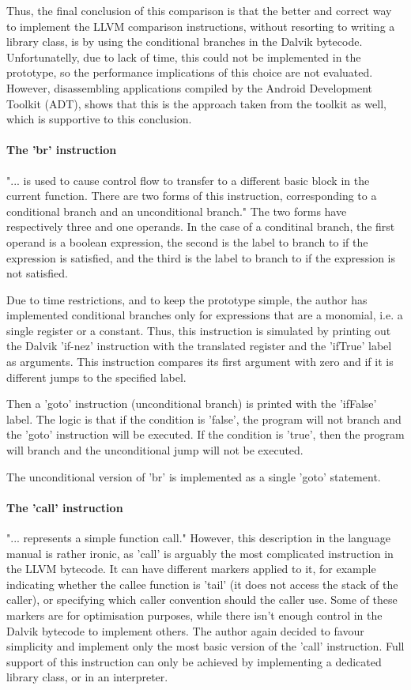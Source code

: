 \documentclass[parskip]{cs4rep}
\begin{document}
Thus, the final conclusion of this comparison is that the better and correct way to implement the LLVM comparison instructions, without resorting to writing a library class, is by using the conditional branches in the Dalvik bytecode. Unfortunatelly, due to lack of time, this could not be implemented in the prototype, so the performance implications of this choice are not evaluated. However, disassembling applications compiled by the Android Development Toolkit (ADT), shows that this is the approach taken from the toolkit as well, which is supportive to this conclusion.

\paragraph{The 'br' instruction} "... is used to cause control flow to transfer to a different basic block in the current function. There are two forms of this instruction, corresponding to a conditional branch and an unconditional branch."\cite{P11} The two forms have respectively three and one operands. In the case of a conditinal branch, the first operand is a boolean expression, the second is the label to branch to if the expression is satisfied, and the third is the label to branch to if the expression is not satisfied.

Due to time restrictions, and to keep the prototype simple, the author has implemented conditional branches only for expressions that are a monomial, i.e. a single register or a constant. Thus, this instruction is simulated by printing out the Dalvik 'if-nez' instruction with the translated register and the 'ifTrue' label as arguments. This instruction compares its first argument with zero and if it is different jumps to the specified label.

Then a 'goto' instruction (unconditional branch) is printed with the 'ifFalse' label. The logic is that if the condition is 'false', the program will not branch and the 'goto' instruction will be executed. If the condition is 'true', then the program will branch and the unconditional jump will not be executed.

The unconditional version of 'br' is implemented as a single 'goto' statement.

\paragraph{The 'call' instruction} "... represents a simple function call."\cite{P11} However, this description in the language manual is rather ironic, as 'call' is arguably the most complicated instruction in the LLVM bytecode. It can have different markers applied to it, for example indicating whether the callee function is 'tail' (it does not access the stack of the caller), or specifying which caller convention should the caller use. Some of these markers are for optimisation purposes, while there isn't enough control in the Dalvik bytecode to implement others. The author again decided to favour simplicity and implement only the most basic version of the 'call' instruction. Full support of this instruction can only be achieved by implementing a dedicated library class, or in an interpreter.
\end{document}
